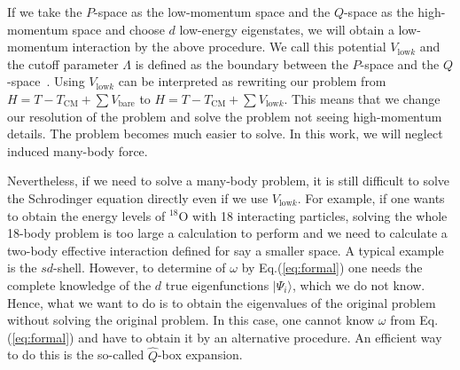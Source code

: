 \documentclass[a4paper]{jpconf}
\newcommand\Vlowk{V_{\mathrm{low}k}}
\def\Nu#1#2#3{{}^{#1}_{#3}\mathrm{#2}}
\def\ket#1{\lvert #1 \rangle}
\begin{document}
  If we take the $P$-space as the low-momentum space and the $Q$-space as the high-momentum
  space and choose $d$ low-energy eigenstates,
  we will obtain a low-momentum interaction by the above procedure.
  We call this potential $\Vlowk$ and the cutoff parameter $\Lambda$ is
  defined as the boundary between the $P$-space and the $Q$-space~\cite{Bogner20031}.
  Using $\Vlowk$ can be interpreted as rewriting our problem from
  $H=T-T_{\mathrm{CM}}+\sum V_{\mathrm{bare}}$ to
  $H=T-T_{\mathrm{CM}}+\sum \Vlowk$.
  This means that we change our resolution of the problem and solve the
  problem not seeing high-momentum details. The problem becomes much easier
  to solve. In this work, we will neglect induced many-body force.

  Nevertheless, if we need to solve a many-body problem, it is still
  difficult to solve the Schrodinger equation directly even if we use
  $\Vlowk$.
  For example, if one wants to obtain the energy levels of $\Nu{18}{O}{}$ with 18 interacting particles,
  solving the whole 18-body problem is too large a calculation to perform
  and we need to calculate a two-body effective interaction defined for say a smaller space. A typical example is the $sd$-shell.
  However, to determine of $\omega$ by Eq.(\ref{eq:formal}) one needs
  the complete knowledge of the $d$ true eigenfunctions $\ket{\Psi_i}$,
  which we do not know.
  Hence,
  what we
  want to do is to obtain the eigenvalues of the original problem
  without solving the original problem.
  In this case,
  one cannot know $\omega$ from Eq.(\ref{eq:formal}) and have to
  obtain it by an alternative procedure.
  An efficient way to do this is the so-called $\hat{Q}$-box expansion.
  
\end{document}
